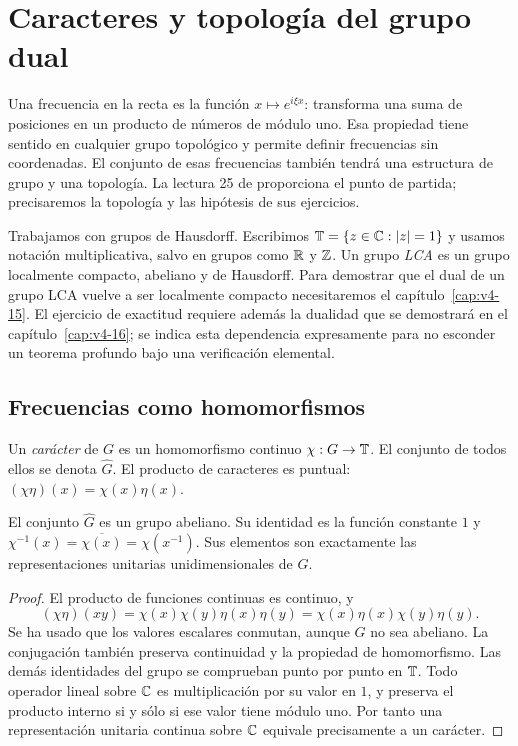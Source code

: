 \chapter{Caracteres y topología del grupo dual}\label{cap:v4-14}
Una frecuencia en la recta es la función $x\mapsto e^{i\xi x}$: transforma una suma de posiciones en un producto de números de módulo uno. Esa propiedad tiene sentido en cualquier grupo topológico y permite definir frecuencias sin coordenadas. El conjunto de esas frecuencias también tendrá una estructura de grupo y una topología. La lectura 25 de \cite{valencia4} proporciona el punto de partida; precisaremos la topología y las hipótesis de sus ejercicios.

Trabajamos con grupos de Hausdorff. Escribimos $\mathbb T=\{z\in\mathbb C:|z|=1\}$ y usamos notación multiplicativa, salvo en grupos como $\mathbb R$ y $\mathbb Z$. Un grupo \emph{LCA} es un grupo localmente compacto, abeliano y de Hausdorff. Para demostrar que el dual de un grupo LCA vuelve a ser localmente compacto necesitaremos el capítulo~\ref{cap:v4-15}. El ejercicio de exactitud requiere además la dualidad que se demostrará en el capítulo~\ref{cap:v4-16}; se indica esta dependencia expresamente para no esconder un teorema profundo bajo una verificación elemental.

\section{Frecuencias como homomorfismos}\label{lectura:v4-25}
\begin{definicion}
Un \emph{carácter} de $G$ es un homomorfismo continuo $\chi:G\to\mathbb T$. El conjunto de todos ellos se denota $\widehat G$. El producto de caracteres es puntual: $(\chi\eta)(x)=\chi(x)\eta(x)$.
\end{definicion}

\begin{proposicion}
El conjunto $\widehat G$ es un grupo abeliano. Su identidad es la función constante $1$ y $\chi^{-1}(x)=\overline{\chi(x)}=\chi(x^{-1})$. Sus elementos son exactamente las representaciones unitarias unidimensionales de $G$.
\end{proposicion}
\begin{proof}
El producto de funciones continuas es continuo, y
\[
 (\chi\eta)(xy)=\chi(x)\chi(y)\eta(x)\eta(y)
 =\chi(x)\eta(x)\chi(y)\eta(y).
\]
Se ha usado que los valores escalares conmutan, aunque $G$ no sea abeliano. La conjugación también preserva continuidad y la propiedad de homomorfismo. Las demás identidades del grupo se comprueban punto por punto en $\mathbb T$. Todo operador lineal sobre $\mathbb C$ es multiplicación por su valor en $1$, y preserva el producto interno si y sólo si ese valor tiene módulo uno. Por tanto una representación unitaria continua sobre $\mathbb C$ equivale precisamente a un carácter.
\end{proof}

